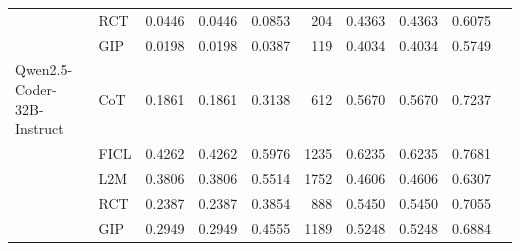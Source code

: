 \documentclass[conference]{IEEEtran}
\begin{document}
\begin{longtable}{p{3.5cm} l r r r r r r r r}
                    & RCT  & 0.0446 & 0.0446 & 0.0853 & 204 & 0.4363 & 0.4363 & 0.6075 \\
                    & GIP  & 0.0198 & 0.0198 & 0.0387 & 119 & 0.4034 & 0.4034 & 0.5749 \\ \addlinespace
Qwen2.5-Coder-32B-Instruct & CoT  & 0.1861 & 0.1861 & 0.3138 & 612 & 0.5670 & 0.5670 & 0.7237 \\
                           & FICL & 0.4262 & 0.4262 & 0.5976 & 1235 & 0.6235 & 0.6235 & 0.7681 \\
                           & L2M  & 0.3806 & 0.3806 & 0.5514 & 1752 & 0.4606 & 0.4606 & 0.6307 \\
                           & RCT  & 0.2387 & 0.2387 & 0.3854 & 888 & 0.5450 & 0.5450 & 0.7055 \\
                           & GIP  & 0.2949 & 0.2949 & 0.4555 & 1189 & 0.5248 & 0.5248 & 0.6884 \\

\end{longtable}
\end{document}
